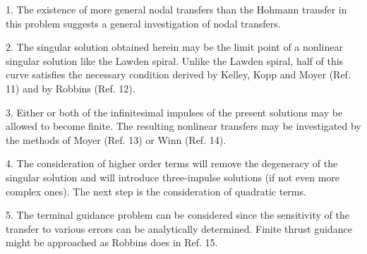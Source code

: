 \documentclass[12pt]{article}
\begin{document}
1. The existence of more general nodal transfers than the Hohmann transfer in this problem suggests a general investigation of nodal transfers.

2. The singular solution obtained herein may be the limit point of a nonlinear singular solution like the Lawden spiral. Unlike the Lawden spiral, half of this curve satisfies the necessary condition derived by Kelley, Kopp and Moyer (Ref. 11) and by Robbins (Ref. 12).

3. Either or both of the infinitesimal impulses of the present solutions may be allowed to become finite. The resulting nonlinear transfers may be investigated by the methods of Moyer (Ref. 13) or Winn (Ref. 14).

4. The consideration of higher order terms will remove the degeneracy of the singular solution and will introduce three-impulse solutions (if not even more complex ones). The next step is the consideration of quadratic terms.

5. The terminal guidance problem can be considered since the sensitivity of the transfer to various errors can be analytically determined. Finite thrust guidance might be approached as Robbins does in Ref. 15.
\end{document}
